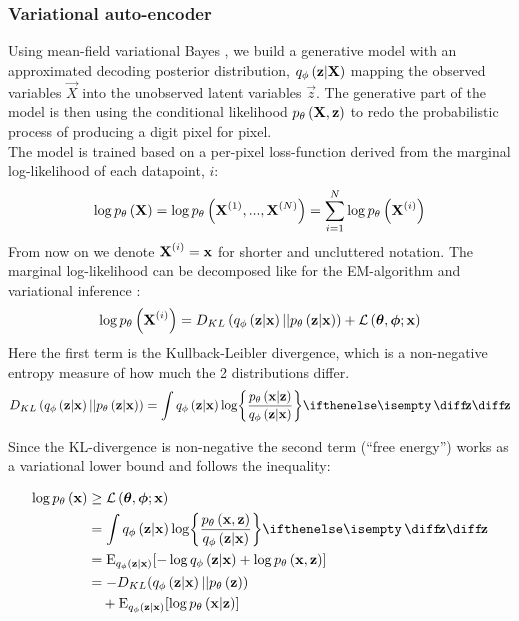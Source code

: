 \subsubsection{Variational auto-encoder}
\label{ssub:vae}

Using mean-field variational Bayes \cite{Kingma2013}, we build a generative model with an approximated decoding posterior distribution, $q_{\phi}\left(\bm{\mathrm{z}}|\bm{\mathrm{X}}\right)$ mapping the observed variables $\vec{X}$ into the unobserved latent variables $\vec{z}$. The generative part of the model is then using the conditional likelihood $p_{\theta}\left(\bm{\mathrm{X}},\bm{\mathrm{z}}\right)$ to redo the probabilistic process of producing a digit pixel for pixel. \\  
The model is trained based on a per-pixel loss-function derived from the marginal log-likelihood of each datapoint, $i$:
\begin{equation}
	\log p_{\theta}\left(\bm{\mathrm{X}}\right) = \log p_{\theta}\left(\bm{\mathrm{X}}^{(1)}, ..., \bm{\mathrm{X}}^{(N)}\right) = \sum^N_{i=1} \log p_{\theta}\left(\bm{\mathrm{X}}^{(i)}\right) 
\end{equation}
From now on we denote $\bm{\mathrm{X}}^{(i)} = \bm{\mathrm{x}}$ for shorter and uncluttered notation.
The marginal log-likelihood can be decomposed like for the EM-algorithm and variational inference \cite[\S10.2]{Bishop2006}:
\begin{equation}
	\log p_{\theta}\left(\bm{\mathrm{X}}^{(i)}\right) = D_{KL}\left( q_{\phi}\left(\bm{\mathrm{z}}|\bm{\mathrm{x}}\right)||p_{\theta}\left(\bm{\mathrm{z}}|\bm{\mathrm{x}}\right)\right) + \mathcal{L}\left(\bm{\mathrm{\theta}},\bm{\mathrm{\phi}};\bm{\mathrm{x}}\right)
\end{equation} 
Here the first term is the Kullback-Leibler divergence, which is a non-negative entropy measure of how much the 2 distributions differ.
\begin{equation}
	D_{KL}\left( \enc{\vec{z}|\vec{x}}||\dec{\vec{z}|\vec{x}}\right) = \int \enc{\vec{z}|\vec{x}} \log \curlies*{ \frac{\dec{\vec{x}|\vec{z}}}{\enc{\vec{z}|\vec{x}} } } \D{\vec{z}}
\end{equation}

Since the KL-divergence is non-negative the second term (``free energy'') works as a variational lower bound and follows the inequality:

\begin{gather}
	\begin{split}
		\log \dec{\vec{x}} & \ge \mathcal{L}\left(\vec{\theta},\vec{\phi};\vec{x}\right)
		\\ & =
		\int \enc{\vec{z}|\vec{x}} \log \curlies*{ \frac{\dec{\vec{x},\vec{z}}}{\enc{\vec{z}|\vec{x}} } } \D{\vec{z}} \\ 
		& = \E_{\enc{\vec{z}|\vec{x}}} \brackets{- \log \enc{\vec{z}|\vec{x}} + \log \dec{\vec{x},\vec{z}} } 
		\\
		& = -D_{KL}\parens{ \enc{\vec{z}|\vec{x}}||\dec{\vec{z}} } 
		\\ 
		& \quad+ \E_{\enc{\vec{z}|\vec{x}}} \brackets{\log \dec{\vec{x}|\vec{z}} }   	
	\end{split} 
\end{gather}

